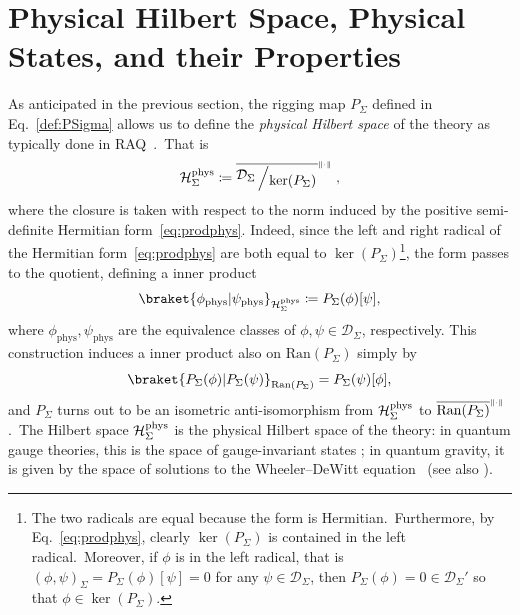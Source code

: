 \documentclass[11pt]{article}
\newcommand{\be}{\begin{equation}}
\newcommand{\ee}{\end{equation}}
\newcommand{\cD}{\mathcal{D}}
\newcommand{\Hphys}{\mathcal{H}_{\Sigma}^{\rm phys}}
\newcommand{\bigslant}[2]{{\raisebox{.2em}{$#1$}\left/\raisebox{-.2em}{$#2$}\right.}}
\theoremstyle{definition}
\DeclarePairedDelimiter{\norm}{\lVert}{\rVert}
\numberwithin{equation}{section}
\begin{document}
\section{Physical Hilbert Space, Physical States, and their Properties}\label{Sec:HphysCLQG}

As anticipated in the previous section, the rigging map $P_{\Sigma}$ defined in Eq.~\eqref{def:PSigma} allows us to define the \emph{physical Hilbert space} of the theory as typically done in RAQ~\cite{Giulini_Marolf_1999a,Giulini_Marolf_1999b,Thiemann_2007}.~That is
\be\label{eq:Hphys}
\Hphys\coloneqq \overline{\bigslant{\cD_{\Sigma}}{\ker(P_{\Sigma})}}^{\scriptscriptstyle \norm{\cdot}}\;,
\ee
where the closure is taken with respect to the norm induced by the positive semi-definite Hermitian form~\eqref{eq:prodphys}. Indeed, since the left and right radical of the Hermitian form~\eqref{eq:prodphys} are both equal to $\ker(P_{\Sigma})$\footnote{The two radicals are equal because the form is Hermitian.~Furthermore, by Eq.~\eqref{eq:prodphys}, clearly $\ker(P_{\Sigma})$ is contained in the left radical.~Moreover, if $\phi$ is in the left radical, that is $(\phi,\psi)_{\Sigma}=P_{\Sigma}(\phi)[\psi]=0$ for any $\psi\in\cD_{\Sigma}$, then $P_{\Sigma}(\phi)=0\in\cD_{\Sigma}'$ so that $\phi\in\ker(P_{\Sigma})$.}, the form passes to the quotient, defining a inner product
\begin{equation}\label{def:physinnprod}
    \braket{\phi_{\mathrm{phys}}|\psi_{\mathrm{phys}}}_{\Hphys}\coloneqq P_{\Sigma}(\phi)[\psi],
\end{equation}
where $\phi_{\mathrm{phys}},\psi_{\mathrm{phys}}$ are the equivalence classes of $\phi,\psi\in\cD_{\Sigma}$, respectively. This construction induces a inner product also on $\mathrm{Ran}(P_{\Sigma})$ simply by
\begin{equation}\label{def:RanPinnprod}
    \braket{P_{\Sigma}(\phi)|P_{\Sigma}(\psi)}_{\mathrm{Ran}(P_{\Sigma})}=P_{\Sigma}(\psi)[\phi],
\end{equation}
and $P_{\Sigma}$ turns out to be an isometric anti-isomorphism from $\Hphys$ to $\overline{\mathrm{Ran}(P_{\Sigma})}^{\scriptscriptstyle \norm{\cdot}}$.~The Hilbert space $\Hphys$ is the physical Hilbert space of the theory: in quantum gauge theories, this is the space of gauge-invariant states \cite{Halliwell:1990qr}; in quantum gravity, it is given by the space of solutions to the Wheeler--DeWitt equation~\cite{Hartle_Hawking_1983,Halliwell:1990qr,Rovelli:1998dx,Noui_Perez_2005} (see also \cite{Alesci_Thiemann_Zipfel_2012,Thiemann_Zipfel_2014}).
\end{document}
